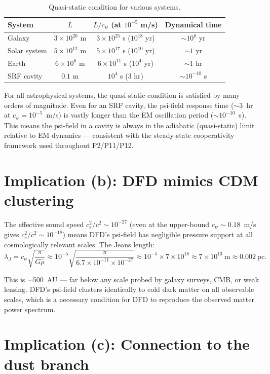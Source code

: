 \documentclass[11pt]{article}
\newcommand{\ee}[1]{\times 10^{#1}}
\begin{document}
\begin{table}[H]
\centering
\caption{Quasi-static condition for various systems.}
\begin{tabular}{@{}lccc@{}}
\toprule
System & $L$ & $L/c_\psi$ (at $10^{-5}$ m/s) & Dynamical time \\
\midrule
Galaxy & $3\ee{20}$ m & $3\ee{25}$ s ($10^{18}$ yr) & $\sim 10^8$ yr \\
Solar system & $5\ee{12}$ m & $5\ee{17}$ s ($10^{10}$ yr) & $\sim 1$ yr \\
Earth & $6\ee{6}$ m & $6\ee{11}$ s ($10^4$ yr) & $\sim 1$ hr \\
SRF cavity & $0.1$ m & $10^4$ s (3 hr) & $\sim 10^{-10}$ s \\
\bottomrule
\end{tabular}
\end{table}

For all astrophysical systems, the quasi-static condition is satisfied by
many orders of magnitude. Even for an SRF cavity, the psi-field response
time ($\sim 3$~hr at $c_\psi = 10^{-5}$~m/s) is vastly longer than the
EM oscillation period ($\sim 10^{-10}$~s). This means the psi-field in a
cavity is always in the adiabatic (quasi-static) limit relative to EM
dynamics --- consistent with the steady-state cooperativity framework
used throughout P2/P11/P12.

\section{Implication (b): DFD mimics CDM clustering}

The effective sound speed $c_s^2/c^2 \sim 10^{-27}$ (even at the
upper-bound $c_\psi \sim 0.18$~m/s gives $c_s^2/c^2 \sim 10^{-18}$)
means DFD's psi-field has negligible pressure support at all cosmologically
relevant scales. The Jeans length:
\begin{equation}
\lambda_J = c_\psi\sqrt{\frac{\pi}{G\bar\rho}} \approx
10^{-5}\sqrt{\frac{\pi}{6.7\ee{-11} \times 10^{-27}}} \approx
10^{-5} \times 7\ee{18} \approx 7\ee{13}~\text{m} \approx 0.002~\text{pc}.
\end{equation}

This is $\sim$500~AU --- far below any scale probed by galaxy surveys,
CMB, or weak lensing. DFD's psi-field clusters identically to cold dark
matter on all observable scales, which is a necessary condition for
DFD to reproduce the observed matter power spectrum.

\section{Implication (c): Connection to the dust branch}
\end{document}
